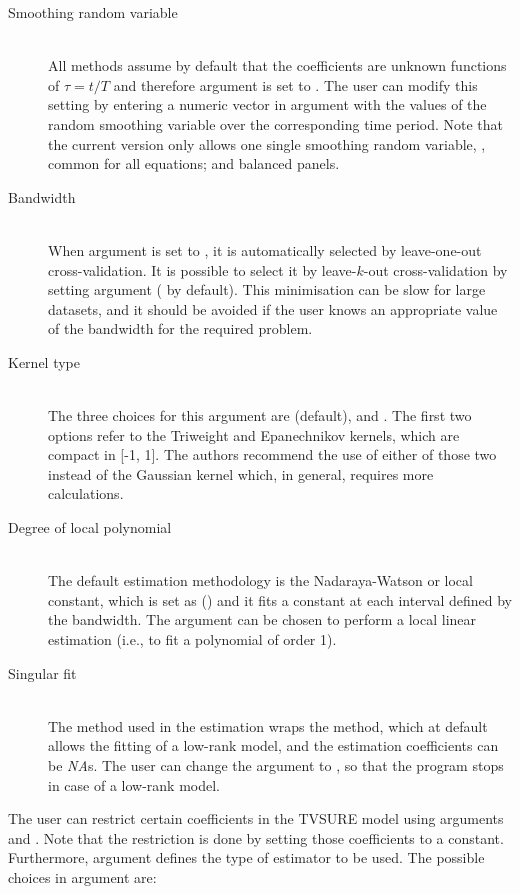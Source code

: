\begin{description}
\item[Smoothing random variable]\hfill\\
All methods assume by default that the coefficients are unknown functions of $\tau = t/T$ and therefore argument  is set to . The user can modify this setting by entering a numeric vector in argument  with the values of the random smoothing variable over the corresponding time period. Note that the current version only allows one single smoothing random variable, , common for all equations; and balanced panels.
\item[Bandwidth] \hfill\\ When argument  is set to , it is automatically selected by leave-one-out cross-validation. It is possible to select it by leave-$k$-out cross-validation \citep{ChuMarron1991} by setting argument  ( by default). This minimisation can be slow for large datasets, and it should be avoided if the user knows an appropriate value of the bandwidth for the required problem. 
\item[Kernel type]\hfill\\ The three choices for this argument are   (default),  and . The first two options refer to the Triweight and Epanechnikov kernels, which are compact in [-1, 1]. The authors recommend the use of either of those two instead of the Gaussian kernel which, in general, requires more calculations.
\item [Degree of local polynomial]\hfill\\
The default estimation methodology is the Nadaraya-Watson or local constant, which is set as  () and it fits a constant at each interval defined by the bandwidth. The argument  can be chosen to perform a local linear estimation (i.e., to fit a polynomial of order 1).
\item [Singular fit] \hfill\\
The  method used in the estimation wraps the  method, which at default allows the fitting of a low-rank model, and the estimation coefficients can be \emph{NA}s. The user can change the argument  to , so that the program stops in case of a low-rank model.
\end{description}
 
The user can restrict certain coefficients in the TVSURE model using arguments  and . Note that the restriction is done by setting those coefficients to a constant. Furthermore, argument  defines the type of estimator to be used. The possible choices in argument  are:

